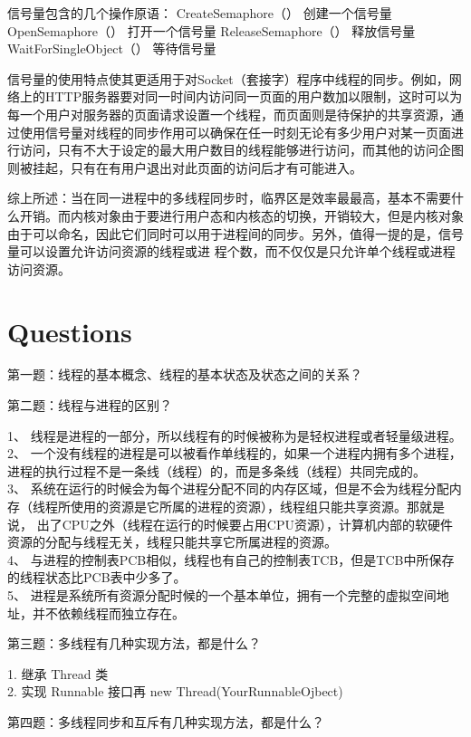 信号量包含的几个操作原语： 
CreateSemaphore（）  创建一个信号量 
OpenSemaphore（）  打开一个信号量 
ReleaseSemaphore（）  释放信号量 
WaitForSingleObject（）  等待信号量 


信号量的使用特点使其更适用于对Socket（套接字）程序中线程的同步。例如，网络上的HTTP服务器要对同一时间内访问同一页面的用户数加以限制，这时可以为每一个用户对服务器的页面请求设置一个线程，而页面则是待保护的共享资源，通过使用信号量对线程的同步作用可以确保在任一时刻无论有多少用户对某一页面进行访问，只有不大于设定的最大用户数目的线程能够进行访问，而其他的访问企图则被挂起，只有在有用户退出对此页面的访问后才有可能进入。
 

综上所述：当在同一进程中的多线程同步时，临界区是效率最最高，基本不需要什么开销。而内核对象由于要进行用户态和内核态的切换，开销较大，但是内核对象由于可以命名，因此它们同时可以用于进程间的同步。另外，值得一提的是，信号量可以设置允许访问资源的线程或进
程个数，而不仅仅是只允许单个线程或进程访问资源。


\section{Questions}

第一题：线程的基本概念、线程的基本状态及状态之间的关系？

第二题：线程与进程的区别？

1、 线程是进程的一部分，所以线程有的时候被称为是轻权进程或者轻量级进程。\\
2、 一个没有线程的进程是可以被看作单线程的，如果一个进程内拥有多个进程，进程的执行过程不是一条线（线程）的，而是多条线（线程）共同完成的。\\
3、 系统在运行的时候会为每个进程分配不同的内存区域，但是不会为线程分配内存（线程所使用的资源是它所属的进程的资源），线程组只能共享资源。那就是说，
出了CPU之外（线程在运行的时候要占用CPU资源），计算机内部的软硬件资源的分配与线程无关，线程只能共享它所属进程的资源。\\
4、 与进程的控制表PCB相似，线程也有自己的控制表TCB，但是TCB中所保存的线程状态比PCB表中少多了。\\
5、 进程是系统所有资源分配时候的一个基本单位，拥有一个完整的虚拟空间地址，并不依赖线程而独立存在。

第三题：多线程有几种实现方法，都是什么？

1. 继承 Thread 类\\
2. 实现 Runnable 接口再 new Thread(YourRunnableOjbect) 

第四题：多线程同步和互斥有几种实现方法，都是什么？

